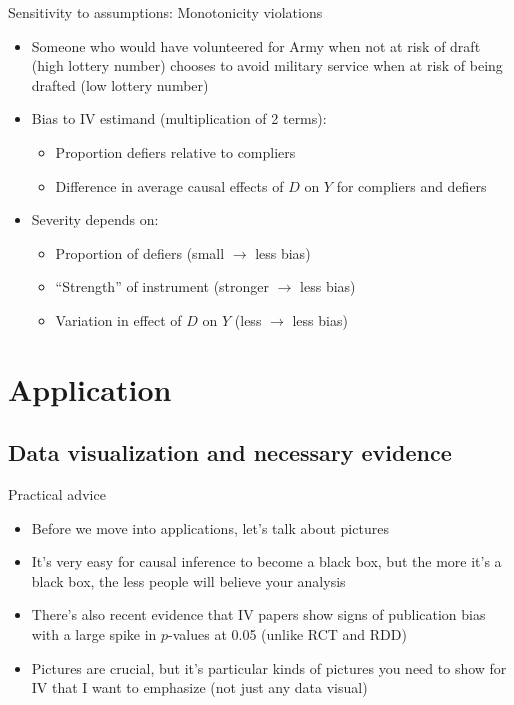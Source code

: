 \documentclass{beamer}
\begin{document}
\begin{frame}{Sensitivity to assumptions: Monotonicity violations}

\begin{itemize}

\item Someone who would have volunteered for Army when not at risk of draft (high lottery number) chooses to avoid military service when at risk of being drafted (low lottery number)
	
\item Bias to IV estimand (multiplication of 2 terms):
		\begin{itemize}
		\item Proportion defiers relative to compliers
		\item Difference in average causal effects of $D$ on $Y$ for compliers and defiers
		\end{itemize}
\item Severity depends on:
		\begin{itemize}
		\item Proportion of defiers (small $\rightarrow$ less bias)
		\item ``Strength'' of instrument (stronger $\rightarrow$ less bias)
		\item Variation in effect of $D$ on $Y$ (less $\rightarrow$ less bias)
		\end{itemize}
\end{itemize}
		
\end{frame}

	
		

\section{Application}

\subsection{Data visualization and necessary evidence}

\begin{frame}{Practical advice}

\begin{itemize}
\item Before we move into applications, let's talk about pictures
\item It's very easy for causal inference to become a black box, but the more it's a black box, the less people will believe your analysis 
\item There's also recent evidence that IV papers show signs of publication bias with a large spike in $p$-values at 0.05 (unlike RCT and RDD)
\item Pictures are crucial, but it's particular kinds of pictures you need to show for IV that I want to emphasize (not just any data visual)

\end{itemize}

\end{frame}
\end{document}
